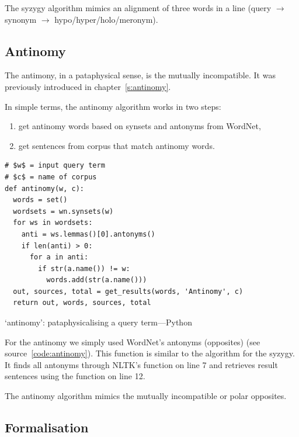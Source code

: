 The syzygy algorithm mimics an alignment of three words in a line (query $\to$ synonym $\to$ hypo/hyper/holo/meronym).


\subsection{Antinomy}
\label{s:antinomyalgo}

The antimony, in a pataphysical sense, is the mutually incompatible. It was previously introduced in chapter~\ref{s:antinomy}.

In simple terms, the antinomy algorithm works in two steps:
\begin{enumerate}
  \item get antinomy words based on synsets and antonyms from WordNet,
  \item get sentences from corpus that match antinomy words.
\end{enumerate}

\begin{listing}[!htbp] %
  \begin{verbatim}
# $w$ = input query term
# $c$ = name of corpus
def antinomy(w, c):
  words = set()
  wordsets = wn.synsets(w)
  for ws in wordsets:
    anti = ws.lemmas()[0].antonyms()
    if len(anti) > 0:
      for a in anti:
        if str(a.name()) != w:
          words.add(str(a.name()))
  out, sources, total = get_results(words, 'Antinomy', c)
  return out, words, sources, total
  \end{verbatim}
\caption[`antinomy' function---Python]{`antinomy': pataphysicalising a query term---Python}
\label{code:antinomy}
\end{listing}

For the antinomy we simply used WordNet's antonyms (opposites) (see source~\ref{code:antinomy}). This function is similar to the algorithm for the syzygy. It finds all antonyms through \ac{NLTK}'s  function on line 7 and retrieves result sentences using the  function on line 12.

The antinomy algorithm mimics the mutually incompatible or polar opposites.


\subsection{Formalisation}
\label{s:formalisation}

